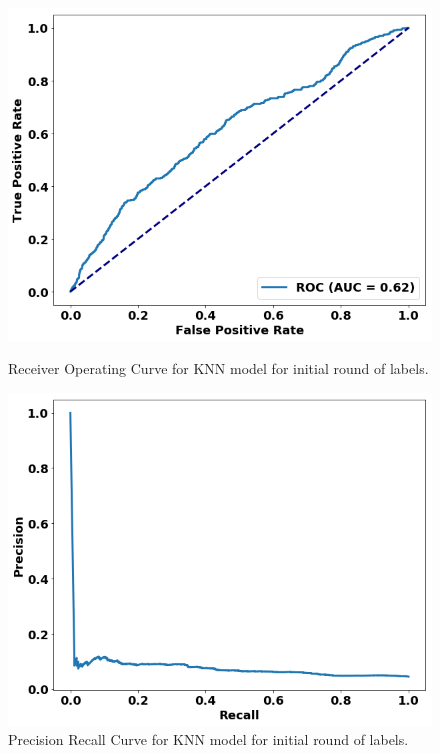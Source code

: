 \begin{figure}
\centering
\begin{minipage}[b]{.4\textwidth}
\includegraphics[trim=0in 0.1in 0.1in 0.in,clip,width=1.0\textwidth]{figures/roc_init.png}
\caption{Receiver Operating Curve for KNN model for initial round of labels.}\label{fig:roc_init}
\end{minipage}\qquad
\begin{minipage}[b]{.4\textwidth}
\includegraphics[trim=0in 0.1in 0.1in 0.in,clip,width=1.0\textwidth]{figures/prc_init.png}
\caption{Precision Recall Curve for KNN model for initial round of labels.}\label{fig:prc_init}
\end{minipage}


\end{figure}
